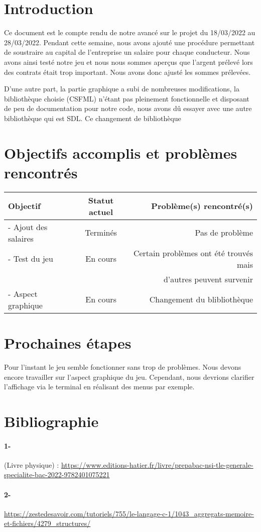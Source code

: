 \documentclass[a4paper, 12pt]{article}
\begin{document}
\newpage



\section*{Introduction}
      Ce document est le compte rendu de notre avancé sur le projet du 18/03/2022 au 28/03/2022. Pendant cette semaine, nous avons ajouté une procédure permettant de soustraire au capital de l'entreprise un salaire pour chaque conducteur. Nous avons ainsi testé notre jeu et nous nous sommes aperçus que l'argent prélevé lors des contrats était trop important. Nous avons donc ajusté les sommes prélevées.

      D'une autre part, la partie graphique a subi de nombreuses modifications, la bibliothèque choisie (CSFML) n'étant pas pleinement fonctionnelle et disposant de peu de documentation pour notre code, nous avons dû essayer avec une autre bibliothèque qui est SDL. Ce changement de bibliothèque 

\section{Objectifs accomplis et problèmes rencontrés}
     \begin{tabular}{|l|c|r|}
  \hline
  Objectif & Statut actuel & Problème(s) rencontré(s) \\
  \hline
   - Ajout des salaires & Terminés & Pas de problème \\
   - Test du jeu & En cours & Certain problèmes ont été trouvés mais \\
    &  & d'autres peuvent survenir \\
     - Aspect graphique & En cours & Changement du blibliothèque \\
  
  

  \hline
\end{tabular}
\section{Prochaines étapes}
    Pour l'instant le jeu semble fonctionner sans trop de problèmes. Nous devons encore travailler sur l'aspect graphique du jeu. Cependant, nous devrions clarifier l'affichage via le terminal en réalisant des menus par exemple.  
    

\appendix  %
\section{Bibliographie}
\paragraph{1- }
(Livre physique) : \url{https://www.editions-hatier.fr/livre/prepabac-nsi-tle-generale-specialite-bac-2022-9782401075221}
\paragraph{2- }
\url{https://zestedesavoir.com/tutoriels/755/le-langage-c-1/1043_aggregats-memoire-et-fichiers/4279_structures/}
\end{document}
